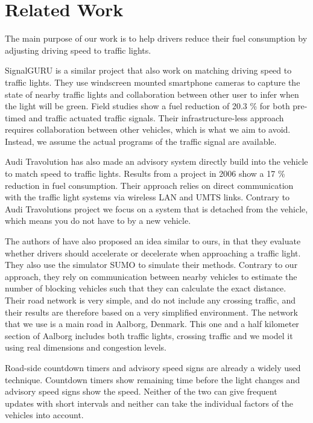 \section{Related Work}\label{sec:RelatedWork}
The main purpose of our work is to help drivers reduce their fuel consumption by adjusting driving speed to traffic lights.

SignalGURU\cite{SignalGURU} is a similar project that also work on matching driving speed to traffic lights.
They use windscreen mounted smartphone cameras to capture the state of nearby traffic lights and collaboration between other user to infer when the light will be green.
Field studies show a fuel reduction of 20.3 \% for both pre-timed and traffic actuated traffic signals.
Their infrastructure-less approach requires collaboration between other vehicles, which is what we aim to avoid.
Instead, we assume the actual programs of the traffic signal are available.

Audi Travolution\cite{audi} has also made an advisory system directly build into the vehicle to match speed to traffic lights.
Results from a project in 2006 show a 17 \% reduction in fuel consumption.
Their approach relies on direct communication with the traffic light systems via wireless LAN and UMTS links.
Contrary to Audi Travolutions project we focus on a system that is detached from the vehicle, which means you do not have to by a new vehicle.

The authors of \cite{VANETsim} have also proposed an idea similar to ours, in that they evaluate whether drivers should accelerate or decelerate when approaching a traffic light.
They also use the simulator SUMO to simulate their methods.
Contrary to our approach, they rely on communication between nearby vehicles to estimate the number of blocking vehicles such that they can calculate the exact distance.
Their road network is very simple, and do not include any crossing traffic, and their results are therefore based on a very simplified environment. 
The network that we use is a main road in Aalborg, Denmark. 
This one and a half kilometer section of Aalborg includes both traffic lights, crossing traffic and we model it using real dimensions and congestion levels.

Road-side countdown timers and advisory speed signs\cite{transyt} are already a widely used technique.
Countdown timers show remaining time before the light changes and advisory speed signs show the speed.
Neither of the two can give frequent updates with short intervals and neither can take the individual factors of the vehicles into account.

